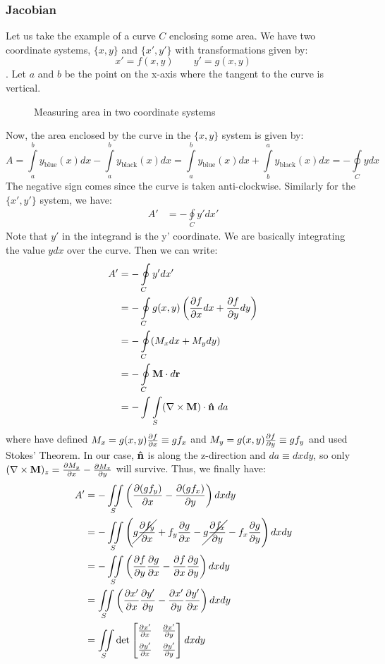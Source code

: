 \subsubsection{Jacobian}
Let us take the example of a curve $C$ enclosing some area. We have two coordinate systems, $\{x,y\}$ and $\{x',y'\}$ with transformations given by:
$$x' = f(x,y)\quad\quad y'=g(x,y)$$. Let $a$ and $b$ be the point on the x-axis where the tangent to the curve is vertical. 
\begin{figure}[H]
    \centering
    
    \caption{Measuring area in two coordinate systems}
\end{figure}
\noindent
Now, the area enclosed by the curve in the $\{x,y\}$ system is given by:
$$A = \int\limits_a^b y_{\mathrm{blue}}(x) dx - \int\limits_a^b y_{\mathrm{black}}(x) dx = \int\limits_a^b y_{\mathrm{blue}}(x) dx + \int\limits_b^a y_{\mathrm{black}}(x) dx = -\oint\limits_{C}y dx$$ 
The negative sign comes since the curve is taken anti-clockwise. Similarly for the $\{x',y'\}$ system, we have:
\begin{align*}
    A' &= -\oint\limits_{C}y' dx' 
\end{align*}
Note that $y'$ in the integrand is the y' coordinate. We are basically integrating the value $ydx$ over the curve. Then we can write:
\begin{align*}
    A' &= -\oint\limits_{C}y' dx' \\
    &= -\oint\limits_{C}g(x,y)\left( \pdv{f}{x}dx+\pdv{f}{y}dy \right)\\
    &= -\oint\limits_{C}(M_xdx + M_ydy)\\
    &= -\oint\limits_{C} \boldsymbol{\mathbf{M}}\cdot d\boldsymbol{\mathbf{r}}\\
&= -\int\int\limits_S (\nabla\times \boldsymbol{\mathbf{M}})\cdot \boldsymbol{\mathbf{\hat{n}}}\ da
\end{align*}
where have defined $M_x = g(x,y)\pdv{f}{x}\equiv gf_x$ and $M_y = g(x,y)\pdv{f}{y}\equiv gf_y$ and used Stokes' Theorem.
In our case, $\boldsymbol{\mathbf{\hat{n}}}$ is along the z-direction and $da \equiv dxdy$, so only $(\nabla\times \boldsymbol{\mathbf{M}})_z = \pdv{M_y}{x}-\pdv{M_x}{y}$ will survive. Thus, we finally have:
\begin{align*}
    A' &=-\iint\limits_S \left( \pdv{(gf_y)}{x}-\pdv{(gf_x)}{y} \right)dxdy\\
    &=-\iint\limits_S \left( \cancel{g\pdv{f_y}{x}}+f_y\pdv{g}{x}-\cancel{g\pdv{f_x}{y}}-f_x\pdv{g}{y} \right)dxdy\\
    &=-\iint\limits_S \left( \pdv{f}{y}\pdv{g}{x} - \pdv{f}{x}\pdv{g}{y} \right)dxdy\\
    &=\iint\limits_S \left(   \pdv{x'}{x}\pdv{y'}{y}-\pdv{x'}{y}\pdv{y'}{x} \right)dxdy\\
    &=\iint\limits_S \det \begin{bmatrix}
        \pdv{x'}{x} & \pdv{x'}{y} \\[0.2cm]
        \pdv{y'}{x} & \pdv{y'}{y}
    \end{bmatrix} dxdy
\end{align*}
